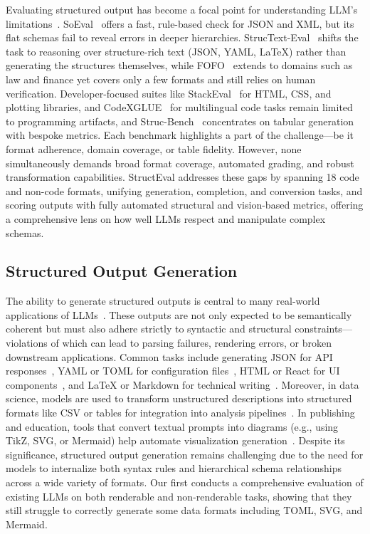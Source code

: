 Evaluating structured output has become a focal point for understanding LLM's limitations~\citep{ning2025picopeerreviewllms}. SoEval~\citep{liu2024soeval} offers a fast, rule-based check for JSON and XML, but its flat schemas fail to reveal errors in deeper hierarchies. StrucText-Eval~\citep{gu2024structext} shifts the task to reasoning over structure-rich text (JSON, YAML, LaTeX) rather than generating the structures themselves, while FOFO~\citep{xia2024fofo} extends to domains such as law and finance yet covers only a few formats and still relies on human verification. Developer-focused suites like StackEval~\citep{shah2024stackeval} for HTML, CSS, and plotting libraries, and CodeXGLUE~\citep{lu2021codexglue} for multilingual code tasks remain limited to programming artifacts, and Struc-Bench~\citep{tang-etal-2024-struc} concentrates on tabular generation with bespoke metrics. Each benchmark highlights a part of the challenge—be it format adherence, domain coverage, or table fidelity. However, none simultaneously demands broad format coverage, automated grading, and robust transformation capabilities. StructEval addresses these gaps by spanning 18 code and non-code formats, unifying generation, completion, and conversion tasks, and scoring outputs with fully automated structural and vision-based metrics, offering a comprehensive lens on how well LLMs respect and manipulate complex schemas.


\subsection{Structured Output Generation}
The ability to generate structured outputs is central to many real-world applications of LLMs~\citep{gu2024structext,tang-etal-2024-struc}. These outputs are not only expected to be semantically coherent but must also adhere strictly to syntactic and structural constraints—violations of which can lead to parsing failures, rendering errors, or broken downstream applications. Common tasks include generating JSON for API responses~\citep{Geng2025JSONSchemaBenchAR}, YAML or TOML for configuration files~\citep{Peddireddy2024EffectiveWA}, HTML or React for UI components~\citep{Si2024Design2CodeBM}, and LaTeX or Markdown for technical writing~\citep{Wen2024OverleafCopilotEA}. Moreover, in data science, models are used to transform unstructured descriptions into structured formats like CSV or tables for integration into analysis pipelines~\citep{Li2023TableGPTTG,Su2024TableGPT2AL}. In publishing and education, tools that convert textual prompts into diagrams (e.g., using TikZ, SVG, or Mermaid) help automate visualization generation~\citep{Lee2025FromTT,Rodriguez2023StarVectorGS,Ku2025TheoremExplainAgentTM}. Despite its significance, structured output generation remains challenging due to the need for models to internalize both syntax rules and hierarchical schema relationships across a wide variety of formats. Our \structeval first conducts a comprehensive evaluation of existing LLMs on both renderable and non-renderable tasks, showing that they still struggle to correctly generate some data formats including TOML, SVG, and Mermaid. 

